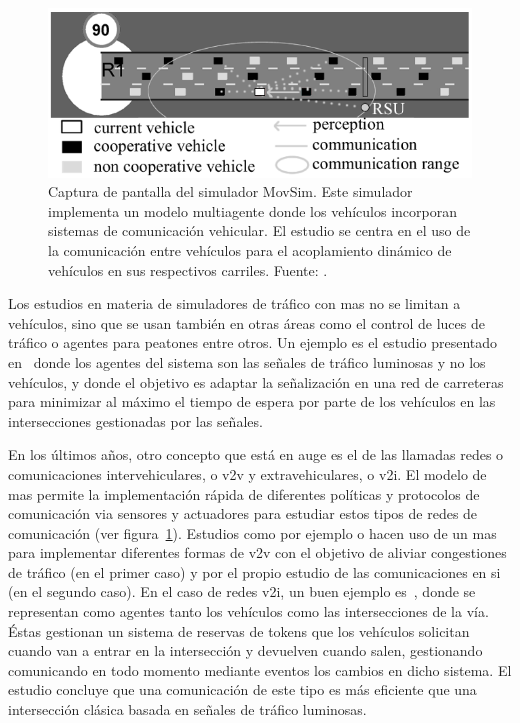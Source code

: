 \begin{figure}
	\centering
	\includegraphics{images/cooperative-traffic-movsim}
	\caption{Captura de pantalla del simulador MovSim. Este simulador implementa un modelo multiagente donde los vehículos incorporan sistemas de comunicación vehicular. El estudio se centra en el uso de la comunicación entre vehículos para el acoplamiento dinámico de vehículos en sus respectivos carriles. Fuente: \cite{Gu2015}.}
	\label{fig:cooperative-traffic-movsim}
\end{figure}

Los estudios en materia de simuladores de tráfico con \ac{mas} no se limitan a vehículos, sino que se usan también en otras áreas como el control de luces de tráfico o agentes para peatones entre otros. Un ejemplo es el estudio presentado en~\cite{Clymer2002} donde los agentes del sistema son las señales de tráfico luminosas y no los vehículos, y donde el objetivo es adaptar la señalización en una red de carreteras para minimizar al máximo el tiempo de espera por parte de los vehículos en las intersecciones gestionadas por las señales.

En los últimos años, otro concepto que está en auge es el de las llamadas redes o comunicaciones intervehiculares, o \ac{v2v} y extravehiculares, o \ac{v2i}. El modelo de \ac{mas} permite la implementación rápida de diferentes políticas y protocolos de comunicación via sensores y actuadores para estudiar estos tipos de redes de comunicación (ver figura~\ref{fig:cooperative-traffic-movsim}). Estudios como por ejemplo \cite{Shiose2001} o \cite{Galis2000} hacen uso de un \ac{mas} para implementar diferentes formas de \ac{v2v} con el objetivo de aliviar congestiones de tráfico (en el primer caso) y por el propio estudio de las comunicaciones en si (en el segundo caso). En el caso de redes \ac{v2i}, un buen ejemplo es~\cite{Dresner2004}, donde se representan como agentes tanto los vehículos como las intersecciones de la vía. Éstas gestionan un sistema de reservas de tokens que los vehículos solicitan cuando van a entrar en la intersección y devuelven cuando salen, gestionando  comunicando en todo momento mediante eventos los cambios en dicho sistema. El estudio concluye que una comunicación de este tipo es más eficiente que una intersección clásica basada en señales de tráfico luminosas.

